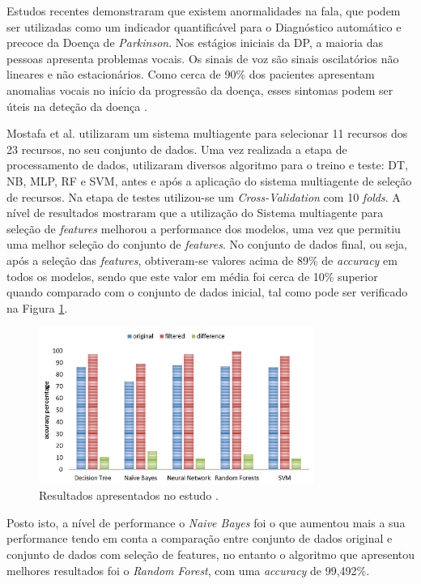 \documentclass[12pt,a4paper,twoside]{report}
\begin{document}
{Estudos recentes demonstraram que existem anormalidades na fala, que podem ser utilizadas como um indicador quantificável para o Diagnóstico automático e precoce da Doença de \textit{Parkinson}. Nos estágios iniciais da \gls{DP}, a maioria das pessoas apresenta problemas vocais. Os sinais de voz são sinais oscilatórios não lineares e não estacionários. Como cerca de 90\% dos pacientes apresentam anomalias vocais no início da progressão da doença, esses sintomas podem ser úteis na deteção da doença \cite{diagnostics12123000}.

Mostafa et al.\cite{MOSTAFA201990} utilizaram um sistema multiagente para selecionar 11 recursos dos 23 recursos, no seu conjunto de dados. Uma vez realizada a etapa de processamento de dados, utilizaram diversos algoritmo para o treino e teste: \gls{DT}, \gls{NB}, \gls{MLP}, \Gls{RF} e \Gls{SVM}, antes e após a aplicação do sistema multiagente de seleção de recursos. Na etapa de testes utilizou-se um \textit{Cross-Validation} com 10 \textit{folds}. A nível de resultados mostraram que a utilização do Sistema multiagente para seleção de \textit{features} melhorou a performance dos modelos, uma vez que permitiu uma melhor seleção do conjunto de \textit{features}. No conjunto de dados final, ou seja, após a seleção das \textit{features}, obtiveram-se valores acima de 89\% de \textit{accuracy} em todos os modelos, sendo que este valor em média foi cerca de 10\% superior quando comparado com o conjunto de dados inicial, tal como pode ser verificado na Figura \ref{fig:mustafa}. 

\begin{figure}[H]
    \centering
    \includegraphics[width=0.8\textwidth]{imagens/mustafaresults.png}
    \caption{Resultados apresentados no estudo \cite{MOSTAFA201990}.}
    \label{fig:mustafa}
\end{figure}

Posto isto, a nível de performance o \textit{Naive Bayes} foi o que aumentou mais a sua performance tendo em conta a comparação entre conjunto de dados original e conjunto de dados com seleção de features, no entanto o algoritmo que apresentou melhores resultados foi o \textit{Random Forest}, com uma \textit{accuracy} de 99,492\%.

}
\end{document}

